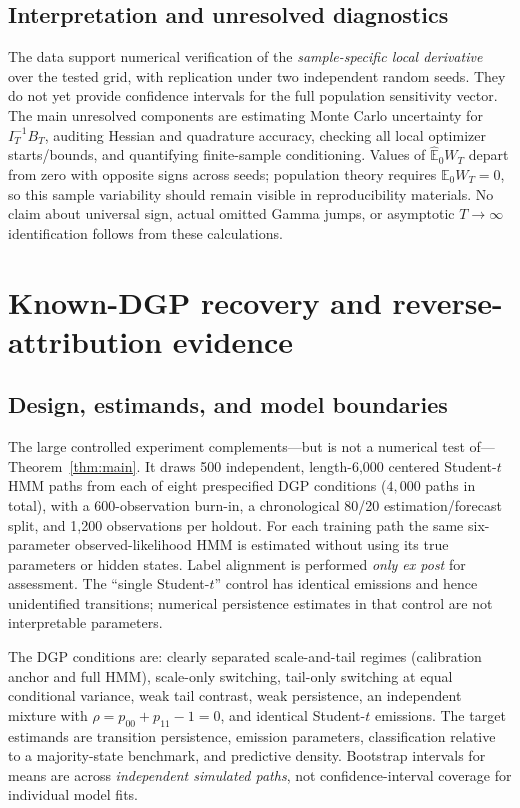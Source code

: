 \documentclass[11pt,a4paper]{article}
\newcommand{\E}{\mathbb E}
\begin{document}
\subsection{Interpretation and unresolved diagnostics}
The data support numerical verification of the \emph{sample-specific local derivative} over the tested grid, with replication under two independent random seeds. They do not yet provide confidence intervals for the full population sensitivity vector. The main unresolved components are estimating Monte Carlo uncertainty for $I_T^{-1}B_T$, auditing Hessian and quadrature accuracy, checking all local optimizer starts/bounds, and quantifying finite-sample conditioning. Values of $\widehat{\E}_0W_T$ depart from zero with opposite signs across seeds; population theory requires $\E_0W_T=0$, so this sample variability should remain visible in reproducibility materials. No claim about universal sign, actual omitted Gamma jumps, or asymptotic $T\to\infty$ identification follows from these calculations.

\section{Known-DGP recovery and reverse-attribution evidence}\label{sec:dgp}
\subsection{Design, estimands, and model boundaries}
The large controlled experiment complements---but is not a numerical test of---Theorem~\ref{thm:main}. It draws 500 independent, length-6,000 centered Student-$t$ HMM paths from each of eight prespecified DGP conditions ($4{,}000$ paths in total), with a 600-observation burn-in, a chronological 80/20 estimation/forecast split, and 1,200 observations per holdout. For each training path the same six-parameter observed-likelihood HMM is estimated without using its true parameters or hidden states. Label alignment is performed \emph{only ex post} for assessment. The ``single Student-$t$'' control has identical emissions and hence unidentified transitions; numerical persistence estimates in that control are not interpretable parameters.

The DGP conditions are: clearly separated scale-and-tail regimes (calibration anchor and full HMM), scale-only switching, tail-only switching at equal conditional variance, weak tail contrast, weak persistence, an independent mixture with $\rho=p_{00}+p_{11}-1=0$, and identical Student-$t$ emissions. The target estimands are transition persistence, emission parameters, classification relative to a majority-state benchmark, and predictive density. Bootstrap intervals for means are across \emph{independent simulated paths}, not confidence-interval coverage for individual model fits.
\end{document}
